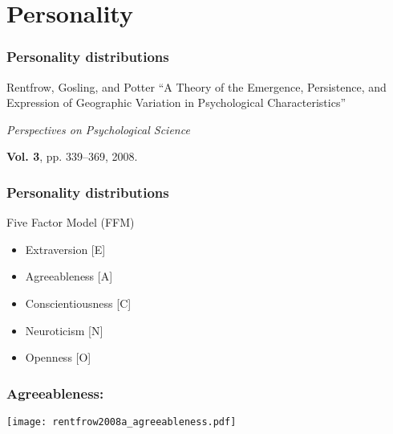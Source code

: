 \section{Personality}

\begin{frame}
  \frametitle{Personality distributions}

  \begin{block}{Rentfrow, Gosling, and Potter\cite{rentfrow2008a}}
    ``A Theory of the Emergence, Persistence, and Expression of Geographic Variation in  Psychological Characteristics''

    \smallskip

    \textit{Perspectives on Psychological Science}

    \smallskip

    \textbf{Vol. 3}, pp. 339--369, 2008.
  \end{block}

\end{frame}

\begin{frame}
  \frametitle{Personality distributions}

  \begin{block}{Five Factor Model (FFM)}
    \begin{itemize}
    \item 
      Extraversion [E]
    \item 
      Agreeableness [A]
    \item 
      Conscientiousness [C]
    \item 
      Neuroticism [N]
    \item 
      Openness [O]
    \end{itemize}

    \bigskip
    
    
    \bigskip

  \end{block}

\end{frame}

\begin{frame}
  \frametitle{Agreeableness:}

  \texttt{[image: rentfrow2008a\_agreeableness.pdf]}

\end{frame}

